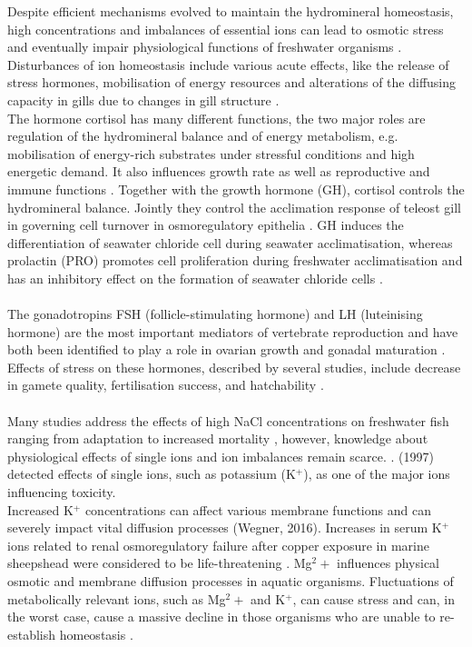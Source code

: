 \documentclass[twoside]{article}
\begin{document}
\begin{multicols}{2}
Despite efficient mechanisms evolved to maintain the hydromineral homeostasis, high concentrations and imbalances of essential ions can lead to osmotic stress and eventually impair physiological functions of freshwater organisms \citep{goodfellow2000,mount1997}. Disturbances of ion homeostasis include various acute effects, like the release of stress hormones, mobilisation of energy resources and alterations of the diffusing capacity in gills due to changes in gill structure \citep{Mcdonald1997,bonga1997}.\\ 

The hormone cortisol has many different functions, the two major roles are regulation of the hydromineral balance and of energy metabolism, e.g. mobilisation of energy-rich substrates under stressful conditions and high energetic demand. It also influences growth rate as well as reproductive and immune functions \citep{bonga1997,pickering1981}. 
Together with the growth hormone (GH), cortisol controls the hydromineral balance. Jointly they control the acclimation response of teleost gill in governing cell turnover in osmoregulatory epithelia \citep{Mccormick2001,Evans2008}. GH induces the differentiation of seawater chloride cell during seawater acclimatisation, whereas prolactin (PRO) promotes cell proliferation during freshwater acclimatisation and has an inhibitory effect on the formation of seawater chloride cells \citep{Sakamoto2006}. \\ \\
The gonadotropins FSH (follicle-stimulating hormone) and LH (luteinising hormone) are the most important mediators of vertebrate reproduction and have both been identified to play a role in ovarian growth and gonadal maturation \citep{So2005}. 
Effects of stress on these hormones, described by several studies, include decrease in gamete quality, fertilisation success, and hatchability \citep{Schlenk2001,Schreck2001}. \\ \\
Many studies address the effects of high NaCl concentrations on freshwater fish ranging from adaptation to increased mortality \citep{shahriari2013}, however, knowledge about physiological effects of single ions and ion imbalances remain scarce. \citep{hubner2007,Canedo2012,goodfellow2000}. \citeauthor{mount1997} (1997) detected effects of single ions, such as potassium (K$^+$), as one of the major ions influencing toxicity. \\
Increased K$^+$ concentrations can affect various membrane functions and can severely impact vital diffusion processes (Wegner, 2016). Increases in serum K$^+$ ions related to renal osmoregulatory failure after copper exposure in marine sheepshead were considered to be life-threatening \cite{cardeilhac1979}. 
Mg${^2+}$ influences physical osmotic and membrane diffusion processes in aquatic organisms. Fluctuations of metabolically relevant ions, such as Mg${^2+}$ and K$^+$, can cause stress and can, in the worst case, cause a massive decline in those organisms who are unable to re-establish homeostasis \citep{wegner2016}. \\



\end{multicols}
\end{document}
